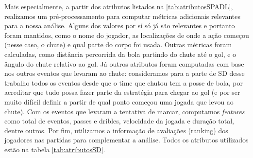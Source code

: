 \documentclass{article}
\begin{document}
Mais especialmente, a partir dos atributos listados na \ref{tab:atributosSPADL}, 
realizamos um  pré-processamento para computar métricas adicionais relevantes 
para a nossa análise. Alguns dos valores por sí só já são relevantes e portanto 
foram mantidos, como o nome do jogador, as localizações de onde a ação 
começou (nesse caso, o chute) e qual parte do corpo foi usada. Outras métricas 
foram calculadas, como distância percorrida da bola partindo do chute até o gol, 
e o ângulo do chute relativo ao gol. Já outros atributos foram computadas com base 
nos outros eventos que levaram ao chute: consideramos para a parte de SD desse 
trabalho todos os eventos desde que o time que chutou tem a posse de bola, por 
acreditar que tudo possa fazer parte da estratégia para chegar ao gol (e por ser 
muito difícil definir a partir de qual ponto começou uma jogada que levou ao chute).
Com os eventos que levaram a tentativa de marcar, computamos \textit{features} como 
total de eventos, passes e dribles, velocidade da jogada e duração total, dentre 
outros. Por fim, utilizamos a informação de avaliações (ranking) dos jogadores 
nas partidas para complementar a análise. Todos os atributos utilizados estão 
na tabela \ref{tab:atributosSD}.
\end{document}

